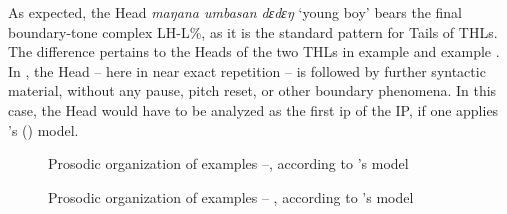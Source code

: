 \z
\z


As expected, the Head \textit{maŋana umbasan dɛdɛŋ} `young boy' bears the final boundary-tone complex LH-L\%, as it is the standard pattern for Tails of THLs.  The difference pertains to the Heads of the two THLs in example  and example . In  ,  the Head -- here in near exact repetition -- is followed by further syntactic material, without any pause, pitch reset, or other  boundary phenomena. In this case, the Head would have to be analyzed as the first ip of the IP, if one applies \citeauthor{Himmelmann_Preliminary_2018}'s (\citeyear{Himmelmann_Preliminary_2018}) model.





\begin{figure}
	\caption{Prosodic organization of examples --, according to \citeauthor{Himmelmann_Preliminary_2018}'s \citeyear{Himmelmann_Preliminary_2018} model}
	\label{Prosodic organization1}
\end{figure}


\begin{figure}
	\caption{Prosodic organization of examples 	--	, according to \citeauthor{Himmelmann_Preliminary_2018}'s \citeyear{Himmelmann_Preliminary_2018} model}
	\label{Prosodic organization}
\end{figure}

